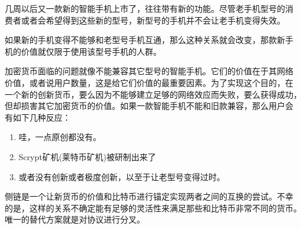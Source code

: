 \documentclass[letterpaper]{article}
\begin{document}
几周以后又一款新的智能手机上市了，往往带有新的功能。尽管老手机型号的消
费者或者会希望得到这些新的型号，新型号的手机并不会让老手机变得失效。

如果新的手机变得不能够和老型号手机互通，那么这种关系就会改变，那款新手
机的价值就仅限于使用该型号手机的人群。

加密货币面临的问题就像不能兼容其它型号的智能手机。它们的价值在于其网络
价值，或者说用户数量，这是给它们价值的最重要因素。为了实现这个目的，在
一个新的创新货币，要么因为不能够建立足够的网络效应而失败，要么获得成功，
但却损害其它加密货币的价值。如果一款智能手机不能和旧款兼容，那么用户会
有如下几种反应：

\begin{enumerate}
\item 哇，一点原创都没有。
\item Scrypt矿机(莱特币矿机)被研制出来了
\item 或者没有创新或者极度创新，以至于让老型号变得过时。
\end{enumerate}

侧链是一个让新货币的价值和比特币进行锚定实现两者之间的互换的尝试。不幸
的是，这样的关系不确定能有足够的灵活性来满足那些和比特币非常不同的货币。
唯一的替代方案就是对协议进行分叉。
\end{document}

